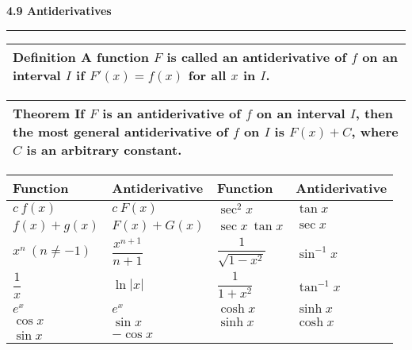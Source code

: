 \documentclass{article}
\begin{document}
\begin{center}
\Large\textbf{4.9 Antiderivatives}

\noindent\hfill\rule{0.3\textwidth}{.4pt}\hfill
\vspace{24pt}

\large
\def\arraystretch{1.3}
{\setlength{\tabcolsep}{16pt}
\begin{tabularx}{.9\textwidth}{|X|}
\hline
	\vspace{1pt}
	\textbf{Definition} \: A function $F$ is called an \textbf{antiderivative} of $f$ on an interval $I$ if $F'(x) = f(x)$ for all $x$ in $I$. \\[12pt]
\hline
\end{tabularx}}
\vspace{12pt}

\large
\def\arraystretch{1.3}
{\setlength{\tabcolsep}{16pt}
\begin{tabularx}{.9\textwidth}{|X|}
\hline
	\vspace{1pt}
	\textbf{Theorem} \: If $F$ is an antiderivative of $f$ on an interval $I$, then the most general antiderivative of $f$ on $I$ is $F(x) + C$, where $C$ is an arbitrary constant. \\[12pt]
\hline
\end{tabularx}}
\vspace{24pt}

\large
\def\arraystretch{2}
{\setlength{\tabcolsep}{16pt}
\begin{tabularx}{.9\textwidth}{| X | l || X | l |}
\hline
	
	\textbf{Function} & \textbf{Antiderivative} & \textbf{Function} & \textbf{Antiderivative}  \\
	\hline
	$c \: f(x)$ & $c \: F(x)$ & $\sec^2 x$ & $\tan x$  \\
	$f(x) + g(x)$ & $F(x) + G(x)$ & $\sec x \: \tan x$ & $\sec x$ \\[12pt]
	$x^n \: (n \ne -1)$ & $\dfrac{x^{n+1}}{n+1}$ & $\dfrac{1}{\sqrt{1-x^2}}$ & $\sin^{-1} x$ \\[16pt]
	$\dfrac{1}{x}$ & $\ln |x|$ & $\dfrac{1}{1+x^2}$ & $\tan^{-1} x$ \\[7pt]
	$e^x$ & $e^x$ & $\cosh x$ & $\sinh x$ \\
	$\cos x$ & $\sin x$ & $\sinh x$ & $\cosh x$ \\
	$\sin x$ & $-\cos x$ & & \\
	
\hline
\end{tabularx}}
\end{center}
\end{document}
